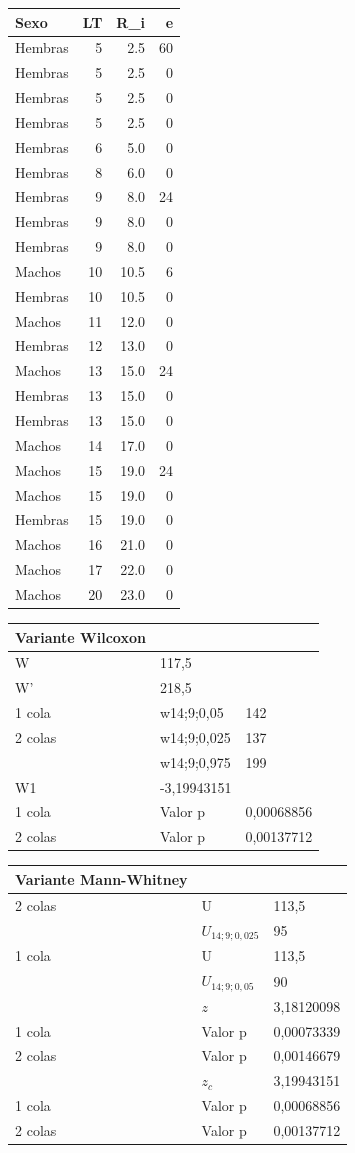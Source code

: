 \documentclass[]{book}
\theoremstyle{definition}
\theoremstyle{definition}
\theoremstyle{definition}
\theoremstyle{remark}
\begin{document}
\begin{tabular}{l|r|r|r}
\hline
Sexo & LT & R\_i & e\\
\hline
Hembras & 5 & 2.5 & 60\\
\hline
Hembras & 5 & 2.5 & 0\\
\hline
Hembras & 5 & 2.5 & 0\\
\hline
Hembras & 5 & 2.5 & 0\\
\hline
Hembras & 6 & 5.0 & 0\\
\hline
Hembras & 8 & 6.0 & 0\\
\hline
Hembras & 9 & 8.0 & 24\\
\hline
Hembras & 9 & 8.0 & 0\\
\hline
Hembras & 9 & 8.0 & 0\\
\hline
Machos & 10 & 10.5 & 6\\
\hline
Hembras & 10 & 10.5 & 0\\
\hline
Machos & 11 & 12.0 & 0\\
\hline
Hembras & 12 & 13.0 & 0\\
\hline
Machos & 13 & 15.0 & 24\\
\hline
Hembras & 13 & 15.0 & 0\\
\hline
Hembras & 13 & 15.0 & 0\\
\hline
Machos & 14 & 17.0 & 0\\
\hline
Machos & 15 & 19.0 & 24\\
\hline
Machos & 15 & 19.0 & 0\\
\hline
Hembras & 15 & 19.0 & 0\\
\hline
Machos & 16 & 21.0 & 0\\
\hline
Machos & 17 & 22.0 & 0\\
\hline
Machos & 20 & 23.0 & 0\\
\hline
\end{tabular}

\begin{longtable}[]{@{}lll@{}}
\toprule
Variante Wilcoxon & &\tabularnewline
\midrule
\endhead
W & 117,5 &\tabularnewline
W' & 218,5 &\tabularnewline
1 cola & w14;9;0,05 & 142\tabularnewline
2 colas & w14;9;0,025 & 137\tabularnewline
& w14;9;0,975 & 199\tabularnewline
W1 & -3,19943151 &\tabularnewline
1 cola & Valor p & 0,00068856\tabularnewline
2 colas & Valor p & 0,00137712\tabularnewline
\bottomrule
\end{longtable}

\begin{longtable}[]{@{}lll@{}}
\toprule
Variante Mann-Whitney & &\tabularnewline
\midrule
\endhead
2 colas & U & 113,5\tabularnewline
& \(U_{14;9;0,025}\) & 95\tabularnewline
1 cola & U & 113,5\tabularnewline
& \(U_{14;9;0,05}\) & 90\tabularnewline
& \(z\) & 3,18120098\tabularnewline
1 cola & Valor p & 0,00073339\tabularnewline
2 colas & Valor p & 0,00146679\tabularnewline
& \(z_c\) & 3,19943151\tabularnewline
1 cola & Valor p & 0,00068856\tabularnewline
2 colas & Valor p & 0,00137712\tabularnewline
\bottomrule
\end{longtable}
\end{document}
